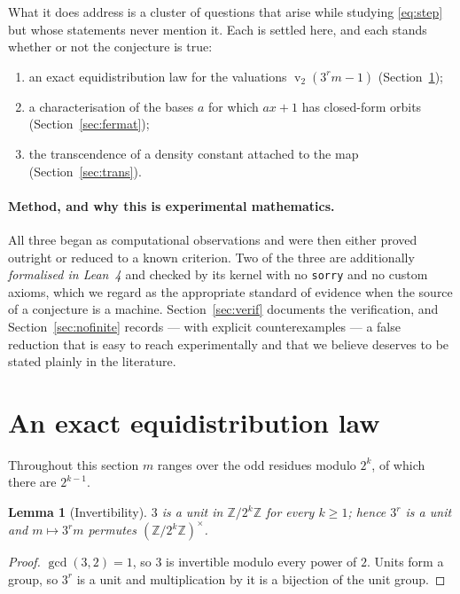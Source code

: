 \documentclass[11pt,a4paper]{article}
\theoremstyle{plain}
\newtheorem{lemma}[theorem]{Lemma}
\theoremstyle{definition}
\newcommand{\val}{\operatorname{v}_2}
\begin{document}
What it does address is a cluster of questions that arise while studying \eqref{eq:step} but
whose statements never mention it. Each is settled here, and each stands whether or not the
conjecture is true:

\begin{enumerate}[label=(\roman*),nosep]
  \item an exact equidistribution law for the valuations $\val(3^{r}m-1)$
        (Section~\ref{sec:geom});
  \item a characterisation of the bases $a$ for which $ax+1$ has closed-form orbits
        (Section~\ref{sec:fermat});
  \item the transcendence of a density constant attached to the map
        (Section~\ref{sec:trans}).
\end{enumerate}

\paragraph{Method, and why this is experimental mathematics.} All three began as
computational observations and were then either proved outright or reduced to a known
criterion. Two of the three are additionally \emph{formalised in Lean~4} and checked by its
kernel with no \texttt{sorry} and no custom axioms, which we regard as the appropriate
standard of evidence when the source of a conjecture is a machine. Section~\ref{sec:verif}
documents the verification, and Section~\ref{sec:nofinite} records --- with explicit
counterexamples --- a false reduction that is easy to reach experimentally and that we
believe deserves to be stated plainly in the literature.

\section{An exact equidistribution law}\label{sec:geom}

Throughout this section $m$ ranges over the odd residues modulo $2^{k}$, of which there are
$2^{k-1}$.

\begin{lemma}[Invertibility]\label{lem:inv}
$3$ is a unit in $\mathbb{Z}/2^{k}\mathbb{Z}$ for every $k\ge1$; hence $3^{r}$ is a unit and
$m\mapsto3^{r}m$ permutes $(\mathbb{Z}/2^{k}\mathbb{Z})^{\times}$.
\end{lemma}
\begin{proof}
$\gcd(3,2)=1$, so $3$ is invertible modulo every power of $2$. Units form a group, so $3^{r}$
is a unit and multiplication by it is a bijection of the unit group.
\end{proof}
\end{document}
